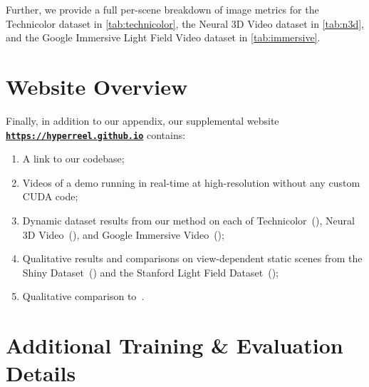 \documentclass[10pt,twocolumn,letterpaper]{article}
\begin{document}
\noindent Further, we provide a full per-scene breakdown of image metrics for the Technicolor dataset in \cref{tab:technicolor}, the Neural 3D Video dataset in \cref{tab:n3d}, and the Google Immersive Light Field Video dataset in \cref{tab:immersive}.

\section{Website Overview}
Finally, in addition to our appendix, our supplemental website \textbf{\href{https://hyperreel.github.io}{\texttt{https://hyperreel.github.io}}} contains:

\begin{enumerate}
    \item A link to our codebase;
    \item Videos of a demo running in real-time at high-resolution without any custom CUDA code;
    \item Dynamic dataset results from our method on each of Technicolor~(\cite{sabater2017dataset}), Neural 3D Video~(\cite{LiSZGLKSLGL2022}), and Google Immersive Video~(\cite{BroxtFOEHDDBWD2020});
    \item Qualitative results and comparisons on view-dependent static scenes from the Shiny Dataset~(\cite{wizadwongsa2021nex}) and the Stanford Light Field Dataset~(\cite{wilburn2005high});
    \item Qualitative comparison to~\cite{BroxtFOEHDDBWD2020}.
\end{enumerate}

\section{Additional Training \& Evaluation Details}
\label{sec:evaluation_details}
\end{document}
